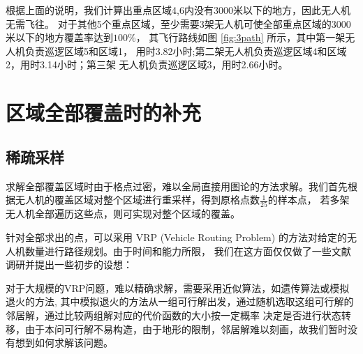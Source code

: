 根据上面的说明，我们计算出重点区域4,6内没有3000米以下的地方，因此无人机无需飞往。
对于其他5个重点区域，至少需要3架无人机可使全部重点区域的3000米以下的地方覆盖率达到$100\%$，
其飞行路线如图 \ref{fig:3path} 所示，其中第一架无人机负责巡逻区域5和区域1，
用时3.82小时;第二架无人机负责巡逻区域4和区域2，用时3.14小时；第三架
无人机负责巡逻区域3，用时2.66小时。

\section{区域全部覆盖时的补充}
\subsection{稀疏采样}
求解全部覆盖区域时由于格点过密，难以全局直接用图论的方法求解。我们首先根据无人机的覆盖区域对整个区域进行重采样，得到原格点数$\frac{1}{25}$的样本点，
若多架无人机全部遍历这些点，则可实现对整个区域的覆盖。

针对全部求出的点，可以采用 VRP (Vehicle Routing Problem) 的方法对给定的无人机数量进行路径规划。由于时间和能力所限，
我们在这方面仅仅做了一些文献调研并提出一些初步的设想：

对于大规模的VRP问题，难以精确求解，需要采用近似算法，如遗传算法或模拟退火\cite{Kirkpatrick1983Optimization}的方法,
其中模拟退火的方法从一组可行解出发，通过随机选取这组可行解的邻居解，通过比较两组解对应的代价函数的大小按一定概率
决定是否进行状态转移，由于本问可行解不易构造，由于地形的限制，邻居解难以刻画，故我们暂时没有想到如何求解该问题。

